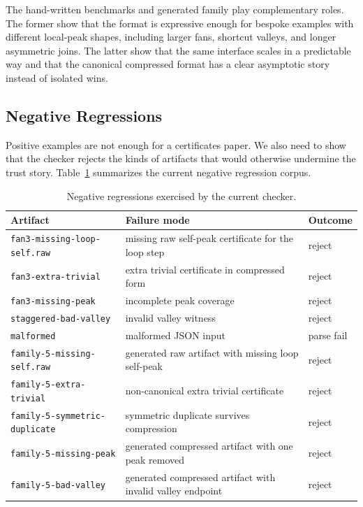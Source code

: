 \documentclass[submission,copyright,creativecommons]{eptcs}
\begin{document}
The hand-written benchmarks and generated family play complementary roles.
The former show that the format is expressive enough for bespoke examples with
different local-peak shapes, including larger fans, shortcut valleys, and
longer asymmetric joins. The latter show that the same interface scales in a
predictable way and that the canonical compressed format has a clear asymptotic
story instead of isolated wins.

\subsection{Negative Regressions}

Positive examples are not enough for a certificates paper. We also need to show
that the checker rejects the kinds of artifacts that would otherwise undermine
the trust story. Table~\ref{tab:negative} summarizes the current negative
regression corpus.

\begin{table}[t]
\centering
\small
\begin{tabular}{p{5.3cm}p{7.0cm}p{1.6cm}}
\toprule
Artifact & Failure mode & Outcome \\
\midrule
\texttt{fan3-missing-loop-self.raw} & missing raw self-peak certificate for the loop step & reject \\
\texttt{fan3-extra-trivial} & extra trivial certificate in compressed form & reject \\
\texttt{fan3-missing-peak} & incomplete peak coverage & reject \\
\texttt{staggered-bad-valley} & invalid valley witness & reject \\
\texttt{malformed} & malformed JSON input & parse fail \\
\texttt{family-5-missing-self.raw} & generated raw artifact with missing loop self-peak & reject \\
\texttt{family-5-extra-trivial} & non-canonical extra trivial certificate & reject \\
\texttt{family-5-symmetric-duplicate} & symmetric duplicate survives compression & reject \\
\texttt{family-5-missing-peak} & generated compressed artifact with one peak removed & reject \\
\texttt{family-5-bad-valley} & generated compressed artifact with invalid valley endpoint & reject \\
\bottomrule
\end{tabular}
\caption{Negative regressions exercised by the current checker.}
\label{tab:negative}
\end{table}
\end{document}

